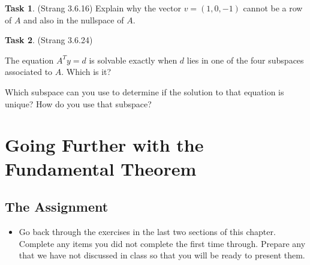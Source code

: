 \documentclass[10pt,]{book}
\theoremstyle{plain}
\theoremstyle{definition}
\numberwithin{equation}{section}
\newtheorem{task}{Task}[chapter]
\begin{document}
\begin{task}
\label{task-119}
(Strang 3.6.16)
        Explain why the vector \(v = (1, 0, -1)\) cannot be a row of \(A\)
        and also in the nullspace of \(A\).
      \end{task}
\begin{task}
\label{task-120}
(Strang 3.6.24)
        
          The equation \(A^Ty = d\) is solvable exactly when \(d\) lies in
          one of the four subspaces associated to \(A\). Which is it?
\par

          Which subspace can you use to determine if the solution to that
          equation is unique? How do you use that subspace?
\end{task}
\clearpage
\typeout{************************************************}
\typeout{************************************************}
\section[Going Further with the Fundamental Theorem]{Going Further with the Fundamental Theorem}\label{ftla-gf.xml}
\typeout{************************************************}
\typeout{************************************************}
\subsection[The Assignment]{The Assignment}\label{subsection-90}
\begin{itemize}
\item{}
        Go back through the exercises in the last two sections of this chapter.
        Complete any items you
        did not complete the first time through. Prepare any that we have not
        discussed in class so that you will be ready to present them.
      \end{itemize}
\typeout{************************************************}
\typeout{************************************************}
\end{document}

